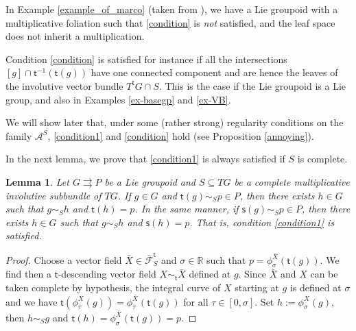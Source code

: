 \documentclass{amsart}
\newtheorem{lemma}[theorem]{Lemma}
\theoremstyle{definition}
\begin{document}
In Example \ref{example_of_marco} (taken from  \cite[Example 6]{Zambon10}),
 we have a Lie groupoid with a multiplicative foliation such that 
\eqref{condition} is \emph{not} satisfied, and the leaf space does not inherit a multiplication.

\medskip

Condition \eqref{condition} is satisfied for instance if all the intersections
$[g]\cap{{\mathsf{t}}}{^{-1}}({{\mathsf{t}}}(g))$ have one connected component 
and are hence the leaves  of the involutive vector bundle
$T^{{\mathsf{t}}} G\cap S$. This is the case if the Lie groupoid is a Lie group, and also
in Examples \ref{ex-basegp} and \ref{ex-VB}.

We will show later that, under some
(rather strong) regularity conditions on the family 
$\mathcal A^S$, \eqref{condition1} and \eqref{condition} hold
(see Proposition \ref{annoying}).

In the next lemma, we prove that \eqref{condition1} is always satisfied if $S$ is complete.

\begin{lemma}\label{existence_of_gH}
Let $G{{\rightrightarrows}} P$ be a Lie groupoid and $S\subseteq TG$ be a \emph{complete} multiplicative 
involutive subbundle of $TG$. If $g\in G$ and ${{\mathsf{t}}}(g)\sim_S p\in P$,
then there exists $h\in G$ such that $g\sim_S h$ and ${{\mathsf{t}}}(h)=p$.
In the same manner, if ${{\mathsf{s}}}(g)\sim_S p\in P$,
then there exists $h\in G$ such that $g\sim_S h$ and ${{\mathsf{s}}}(h)=p$.
That is, condition \eqref{condition1} is satisfied.
\end{lemma}
\begin{proof}
Choose a vector field $\bar X\in\bar{\mathcal F}^{{\mathsf{t}}}_S$ and $\sigma\in{\mathbb{R}}$ such that
$p=\phi_\sigma^{\bar X}({{\mathsf{t}}}(g))$. We find then a ${{\mathsf{t}}}$-descending vector field 
$X\sim_{{\mathsf{t}}} \bar X$ defined at $g$.
Since $\bar X$ and $X$ can be taken complete by hypothesis,
the integral curve  of $X$ starting at $g$ is defined at $\sigma$ and
 we have  ${{\mathsf{t}}}(\phi^X_\tau(g))=\phi_\tau^{\bar X}({{\mathsf{t}}}(g))$ for all 
$\tau\in[0,\sigma]$. Set $h:=\phi^X_\sigma(g)$, then 
$h\sim_S g$ and ${{\mathsf{t}}}(h)=\phi_\sigma^{\bar X}({{\mathsf{t}}}(g))=p$.
\end{proof}
\end{document}
